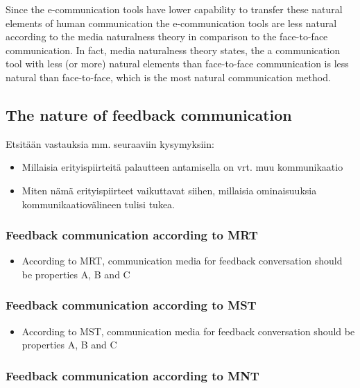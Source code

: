 \documentclass[english,12pt,a4paper,pdftex]{article}
\begin{document}
Since the e-communication tools have lower capability to transfer these natural elements of human communication the e-communication tools are less natural according to the media naturalness theory in comparison to the face-to-face communication. In fact, media naturalness theory states, the a communication tool with less (or more) natural elements than face-to-face communication is less natural than face-to-face, which is the most natural communication method. \citep{kock2005} \citep{kock2004}

\subsection{The nature of feedback communication}

Etsitään vastauksia mm. seuraaviin kysymyksiin:

\begin{itemize}
\item Millaisia erityispiirteitä palautteen antamisella on vrt. muu kommunikaatio
\item Miten nämä erityispiirteet vaikuttavat siihen, millaisia ominaisuuksia kommunikaatiovälineen tulisi tukea.
\end{itemize}

\subsubsection{Feedback communication according to MRT}

\begin{itemize}
\item According to MRT, communication media for feedback conversation should be properties A, B and C
\end{itemize}

\subsubsection{Feedback communication according to MST}

\begin{itemize}
\item According to MST, communication media for feedback conversation should be properties A, B and C
\end{itemize}

\subsubsection{Feedback communication according to MNT}
\end{document}
